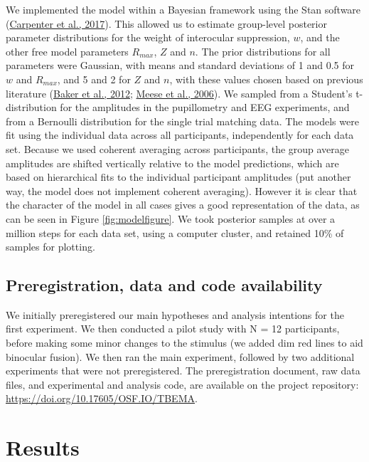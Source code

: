 \documentclass[
]{article}
\begin{document}
We implemented the model within a Bayesian framework using the Stan software (\protect\hyperlink{ref-Carpenter2017}{Carpenter et al., 2017}). This allowed us to estimate group-level posterior parameter distributions for the weight of interocular suppression, \(w\), and the other free model parameters \(R_{max}\), \(Z\) and \(n\). The prior distributions for all parameters were Gaussian, with means and standard deviations of 1 and 0.5 for \(w\) and \(R_{max}\), and 5 and 2 for \(Z\) and \(n\), with these values chosen based on previous literature (\protect\hyperlink{ref-Baker2012}{Baker et al., 2012}; \protect\hyperlink{ref-Meese2006}{Meese et al., 2006}). We sampled from a Student's t-distribution for the amplitudes in the pupillometry and EEG experiments, and from a Bernoulli distribution for the single trial matching data. The models were fit using the individual data across all participants, independently for each data set. Because we used coherent averaging across participants, the group average amplitudes are shifted vertically relative to the model predictions, which are based on hierarchical fits to the individual participant amplitudes (put another way, the model does not implement coherent averaging). However it is clear that the character of the model in all cases gives a good representation of the data, as can be seen in Figure \ref{fig:modelfigure}. We took posterior samples at over a million steps for each data set, using a computer cluster, and retained 10\% of samples for plotting.

\hypertarget{preregistration-data-and-code-availability}{%
\subsection{Preregistration, data and code availability}\label{preregistration-data-and-code-availability}}

We initially preregistered our main hypotheses and analysis intentions for the first experiment. We then conducted a pilot study with N = 12 participants, before making some minor changes to the stimulus (we added dim red lines to aid binocular fusion). We then ran the main experiment, followed by two additional experiments that were not preregistered. The preregistration document, raw data files, and experimental and analysis code, are available on the project repository: \url{https://doi.org/10.17605/OSF.IO/TBEMA}.

\hypertarget{results}{%
\section{Results}\label{results}}
\end{document}
